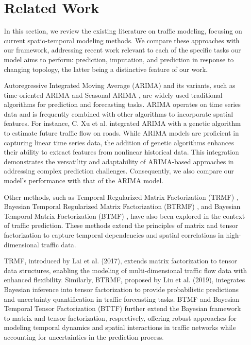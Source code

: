 \section{Related Work}\label{sec:related-works}

In this section, we review the existing literature on traffic modeling, focusing on current spatio-temporal modeling methods. We compare these approaches with our framework, addressing recent work relevant to each of the specific tasks our model aims to perform: prediction, imputation, and prediction in response to changing topology, the latter being a distinctive feature of our work.

Autoregressive Integrated Moving Average (ARIMA) \cite{arima} and its variants, such as time-oriented ARIMA \cite{time_arima} and Seasonal ARIMA \cite{sarima}, are widely used traditional algorithms for prediction and forecasting tasks. ARIMA operates on time series data and is frequently combined with other algorithms to incorporate spatial features. For instance, C. Xu et al. integrated ARIMA with a genetic algorithm to estimate future traffic flow on roads. While ARIMA models are proficient in capturing linear time series data, the addition of genetic algorithms enhances their ability to extract features from nonlinear historical data. This integration demonstrates the versatility and adaptability of ARIMA-based approaches in addressing complex prediction challenges. Consequently, we also compare our model's performance with that of the ARIMA model.

Other methods, such as Temporal Regularized Matrix Factorization (TRMF) \cite{trmf}, Bayesian Temporal Regularized Matrix Factorization (BTRMF) \cite{btrmf}, and Bayesian Temporal Matrix Factorization (BTMF) \cite{btrmf}, have also been explored in the context of traffic prediction. These methods extend the principles of matrix and tensor factorization to capture temporal dependencies and spatial correlations in high-dimensional traffic data.

TRMF, introduced by Lai et al. (2017), extends matrix factorization to tensor data structures, enabling the modeling of multi-dimensional traffic flow data with enhanced flexibility. Similarly, BTRMF, proposed by Liu et al. (2019), integrates Bayesian inference into tensor factorization to provide probabilistic predictions and uncertainty quantification in traffic forecasting tasks. BTMF and Bayesian Temporal Tensor Factorization (BTTF) further extend the Bayesian framework to matrix and tensor factorization, respectively, offering robust approaches for modeling temporal dynamics and spatial interactions in traffic networks while accounting for uncertainties in the prediction process.

